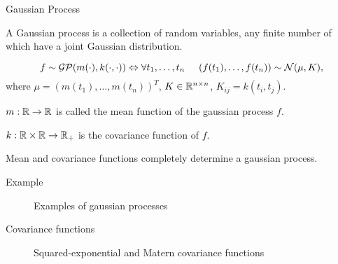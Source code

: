 \begin{frame}{Gaussian Process}
			\begin{definition}
				A Gaussian process is a collection of random variables, any finite number of which have a joint Gaussian distribution.
			\end{definition}

			$$f \sim \mathcal{GP}(m(\cdot), k(\cdot, \cdot)) \Leftrightarrow \forall t_1, \ldots, t_n \hspace{0.5cm} (f(t_1), \ldots, f(t_n)) \sim \mathcal{N}(\mu, K),$$
			where $\mu = (m(t_1), \ldots, m(t_n))^T$, $K \in \mathbb{R}^{n \times n}$, $K_{ij} = k(t_i, t_j)$.

			$m: \mathbb{R} \rightarrow \mathbb{R}$ is called the mean function of the gaussian process $f$.

			$k: \mathbb{R} \times \mathbb{R} \rightarrow \mathbb{R}_+$ is the covariance function of $f$.

			\vspace{0.5cm}
			Mean and covariance functions completely determine a gaussian process.

		\end{frame}

		\begin{frame}{Example}
			\begin{figure}[!h]
				\centering
				\subfloat{
					\scalebox{0.5}{
						
					}
				}
				\subfloat{
					\scalebox{0.5}{
						
					}
				}
				\caption{Examples of gaussian processes}
			\end{figure}
		\end{frame}

		\begin{frame}{Covariance functions}
			\begin{figure}[!h]
				\centering

				\subfloat{
					\scalebox{0.3}{
						
					}
				}
				\subfloat{
					\scalebox{0.3}{
						
					}
				}
				\subfloat{
					\scalebox{0.3}{
						
					}
				}

				\subfloat{
					\scalebox{0.3}{
						
					}
				}
				\subfloat{
					\scalebox{0.3}{
						
					}
				}
				\subfloat{
					\scalebox{0.3}{
						
					}
				}
				\caption{Squared-exponential and Matern covariance functions}
			\end{figure}
		\end{frame}